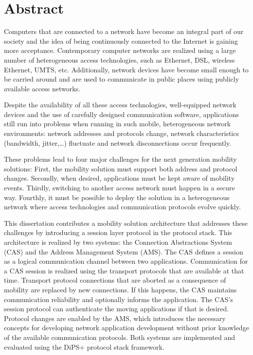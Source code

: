 \section*{Abstract}

Computers that are connected to a network have become an integral part of our society and the idea of being continuously connected to the Internet is gaining more acceptance.  Contemporary computer networks are realized using a large number of heterogeneous access technologies, such as Ethernet, DSL, wireless Ethernet, UMTS, etc.   Additionally, network devices have become small enough to be carried around and are used to communicate in public places using publicly available access networks.

Despite the availability of all these access technologies, well-equipped network devices and the use of carefully designed communication software, applications still run into problems when running in such mobile, heterogeneous network environments: network addresses and protocols change, network characteristics (bandwidth, jitter,\dots) fluctuate and network disconnections occur frequently.

These problems lead to four major challenges for the next generation mobility solutions:  First, the mobility solution must support both address and protocol changes. Secondly, when desired, applications must be kept aware of mobility events. Thirdly, switching to another access network must happen in a secure way. Fourthly, it must be possible to deploy the solution in a heterogeneous network where access technologies and communication protocols evolve quickly.

This dissertation contributes a mobility solution architecture that addresses these challenges by introducing a session layer protocol in the protocol stack.  This architecture is realized by two systems:  the Connection Abstractions System (CAS) and the Address Management System (AMS).  The CAS defines a session as a logical communication channel between two applications.  Communication for a CAS session is realized using the transport protocols that are available at that time.  Transport protocol connections that are aborted as a consequence of mobility are replaced by new connections.  If this happens, the CAS maintains communication reliability and optionally informs the application.  The CAS's session protocol can authenticate the moving applications if that is desired.  Protocol changes are enabled by the AMS, which introduces the necessary concepts for developing network application development without prior knowledge of the available communication protocols.  Both systems are implemented and evaluated using the DiPS+ protocol stack framework.

